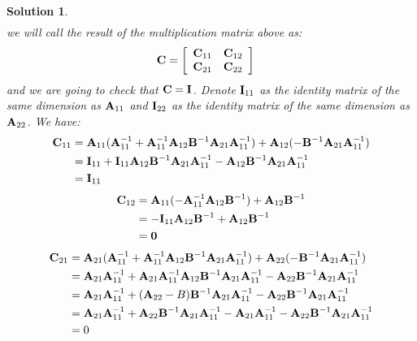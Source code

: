 \documentclass[11pt]{article}\usepackage[]{graphicx}\usepackage[]{color}
\newtheorem{sol}{Solution}
\begin{document}
\begin{sol}
\begin{align*}
	\end{align*}
	we will call the result of the multiplication matrix above as:
	\begin{align*}
		{\bf C} &= \left[\begin{array}{cc} {\bf C}_{11}& {\bf C}_{12}\\ {\bf C}_{21}& {\bf C}_{22}\end{array}\right]
	\end{align*}
	and we are going to check that ${\bf C} = {\bf I}$.\vskip 2mm
	Denote ${\bf I}_{11}$ as the identity matrix of the same dimension as ${\bf A}_{11}$ and ${\bf I}_{22}$ as the identity matrix of the same dimension as ${\bf A}_{22}$. \vskip 2mm
	We have:
	\begin{align*}
		{\bf C}_{11} &= {\bf A}_{11}({\bf A}_{11}^{-1} + {\bf A}_{11}^{-1}{\bf A}_{12}{\bf B}^{-1}{\bf A}_{21}{\bf A}_{11}^{-1}) + {\bf A}_{12}(-{\bf B}^{-1}{\bf A}_{21}{\bf A}_{11}^{-1}) \\
		&= {\bf I}_{11} + {\bf I}_{11}{\bf A}_{12}{\bf B}^{-1}{\bf A}_{21}{\bf A}_{11}^{-1} - {\bf A}_{12}{\bf B}^{-1}{\bf A}_{21}{\bf A}_{11}^{-1}\\
		&= {\bf I}_{11}
	\end{align*}
	\begin{align*}
		{\bf C}_{12} &={\bf A}_{11}(-{\bf A}_{11}^{-1}{\bf A}_{12}{\bf B}^{-1}) + {\bf A}_{12}{\bf B}^{-1} \\
		&= -{\bf I}_{11}{\bf A}_{12}{\bf B}^{-1} + {\bf A}_{12}{\bf B}^{-1}\\
		&= {\bf 0}
	\end{align*}
	\begin{align*}
		{\bf C}_{21} &= {\bf A}_{21}({\bf A}_{11}^{-1} + {\bf A}_{11}^{-1}{\bf A}_{12}{\bf B}^{-1}{\bf A}_{21}{\bf A}_{11}^{-1}) + {\bf A}_{22}(-{\bf B}^{-1}{\bf A}_{21}{\bf A}_{11}^{-1})\\
		&= {\bf A}_{21}{\bf A}_{11}^{-1} + {\bf A}_{21}{\bf A}_{11}^{-1}{\bf A}_{12}{\bf B}^{-1}{\bf A}_{21}{\bf A}_{11}^{-1} - {\bf A}_{22}{\bf B}^{-1}{\bf A}_{21}{\bf A}_{11}^{-1}\\
		&= {\bf A}_{21}{\bf A}_{11}^{-1} + ({\bf A}_{22} - B){\bf B}^{-1}{\bf A}_{21}{\bf A}_{11}^{-1} - {\bf A}_{22}{\bf B}^{-1}{\bf A}_{21}{\bf A}_{11}^{-1}\\
		&= {\bf A}_{21}{\bf A}_{11}^{-1} + {\bf A}_{22}{\bf B}^{-1}{\bf A}_{21}{\bf A}_{11}^{-1} - {\bf A}_{21}{\bf A}_{11}^{-1} - {\bf A}_{22}{\bf B}^{-1}{\bf A}_{21}{\bf A}_{11}^{-1}\\
		&= 0
	\end{align*}

\end{sol}
\end{document}
